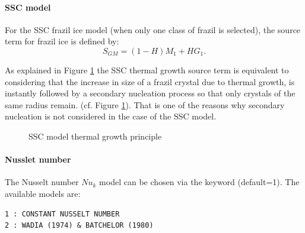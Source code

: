 \paragraph{SSC model}

For the SSC frazil ice model (when only one class of frazil is selected),
 the source term for frazil ice is defined by:
\begin{equation}
S_{GM} = (1-H)M_{1} + HG_{1}.
\label{eq:model:sgm:monoclass}
\end{equation}

As explained in Figure \ref{fig:sgm_monoclass} the SSC thermal growth source term
is equivalent to considering that the increase in size of a frazil crystal due to thermal growth,
is instantly followed by a secondary nucleation process so that only crystals of the same radius remain.
(cf. Figure \ref{fig:sgm_monoclass}). That is one of the reasons why secondary nucleation is not
considered in the case of the SSC model.

\begin{figure}[H]
    \begin{center}
    \end{center}
    \caption{SSC model thermal growth principle}
    \label{fig:sgm_monoclass}
\end{figure}


\paragraph{Nusslet number}
\label{paragraph:nusselt}
The Nusselt number $Nu_k$ model can be chosen via the keyword  (default=1).
The available models are:
\begin{lstlisting}
1 : CONSTANT NUSSELT NUMBER
2 : WADIA (1974) & BATCHELOR (1980)
\end{lstlisting}

